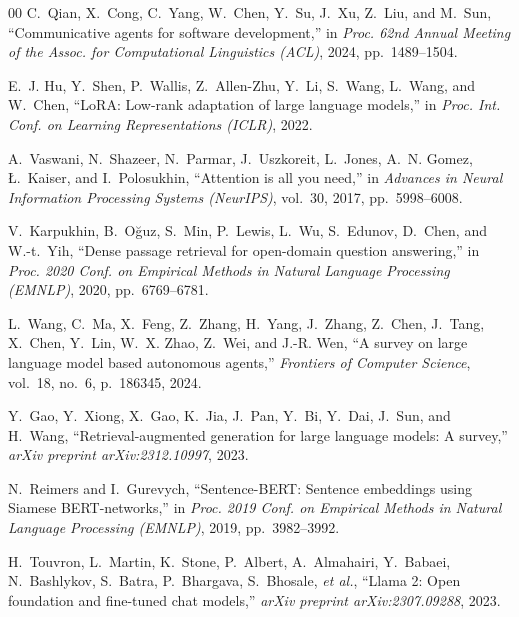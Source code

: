\documentclass[conference]{IEEEtran}
\begin{document}
\begin{thebibliography}{00}
C.~Qian, X.~Cong, C.~Yang, W.~Chen, Y.~Su, J.~Xu, Z.~Liu, and M.~Sun, ``Communicative agents for software development,'' in \textit{Proc. 62nd Annual Meeting of the Assoc. for Computational Linguistics (ACL)}, 2024, pp.~1489--1504.

E.~J. Hu, Y.~Shen, P.~Wallis, Z.~Allen-Zhu, Y.~Li, S.~Wang, L.~Wang, and W.~Chen, ``LoRA: Low-rank adaptation of large language models,'' in \textit{Proc. Int. Conf. on Learning Representations (ICLR)}, 2022.

A.~Vaswani, N.~Shazeer, N.~Parmar, J.~Uszkoreit, L.~Jones, A.~N. Gomez, {\L}.~Kaiser, and I.~Polosukhin, ``Attention is all you need,'' in \textit{Advances in Neural Information Processing Systems (NeurIPS)}, vol.~30, 2017, pp.~5998--6008.

V.~Karpukhin, B.~O{\u{g}}uz, S.~Min, P.~Lewis, L.~Wu, S.~Edunov, D.~Chen, and W.-t.~Yih, ``Dense passage retrieval for open-domain question answering,'' in \textit{Proc. 2020 Conf. on Empirical Methods in Natural Language Processing (EMNLP)}, 2020, pp.~6769--6781.

L.~Wang, C.~Ma, X.~Feng, Z.~Zhang, H.~Yang, J.~Zhang, Z.~Chen, J.~Tang, X.~Chen, Y.~Lin, W.~X. Zhao, Z.~Wei, and J.-R. Wen, ``A survey on large language model based autonomous agents,'' \textit{Frontiers of Computer Science}, vol.~18, no.~6, p.~186345, 2024.

Y.~Gao, Y.~Xiong, X.~Gao, K.~Jia, J.~Pan, Y.~Bi, Y.~Dai, J.~Sun, and H.~Wang, ``Retrieval-augmented generation for large language models: A survey,'' \textit{arXiv preprint arXiv:2312.10997}, 2023.

N.~Reimers and I.~Gurevych, ``Sentence-BERT: Sentence embeddings using Siamese BERT-networks,'' in \textit{Proc. 2019 Conf. on Empirical Methods in Natural Language Processing (EMNLP)}, 2019, pp.~3982--3992.

H.~Touvron, L.~Martin, K.~Stone, P.~Albert, A.~Almahairi, Y.~Babaei, N.~Bashlykov, S.~Batra, P.~Bhargava, S.~Bhosale, \textit{et al.}, ``Llama 2: Open foundation and fine-tuned chat models,'' \textit{arXiv preprint arXiv:2307.09288}, 2023.

\end{thebibliography}
\end{document}
